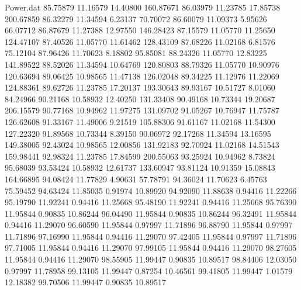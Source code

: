 \begin{filecontents}{Power.dat}
  85.75879   11.16579   14.40800  160.87671
  86.03979   11.23785   17.85738  200.67859
  86.32279   11.34594    6.23137   70.70072
  86.60079   11.09373    5.95626   66.07712
  86.87679   11.27388   12.97550  146.28423
  87.15579   11.05770   11.25650  124.47107
  87.40526   11.05770   11.61462  128.43109
  87.68226   11.02168    6.81576   75.12104
  87.96426   11.70623    8.18802   95.85081
  88.24326   11.05770   12.83225  141.89522
  88.52026   11.34594   10.64769  120.80803
  88.79326   11.05770   10.90976  120.63694
  89.06425   10.98565   11.47138  126.02048
  89.34225   11.12976   11.22069  124.88361
  89.62726   11.23785   17.20137  193.30643
  89.93167   10.51727    8.01060   84.24966
  90.21168   10.58932   12.40250  131.33408
  90.49168   10.73344   19.20687  206.15579
  90.77168   10.94962   11.97275  131.09702
  91.05267   10.76947   11.75787  126.62608
  91.33167   11.49006    9.21519  105.88306
  91.61167   11.02168   11.54300  127.22320
  91.89568   10.73344    8.39150   90.06972
  92.17268   11.34594   13.16595  149.38005
  92.43024   10.98565   12.00856  131.92183
  92.70924   11.02168   14.51543  159.98441
  92.98324   11.23785   17.84599  200.55063
  93.25924   10.94962    8.73824   95.68039
  93.53424   10.58932   12.61737  133.60947
  93.81124   10.91359   15.08843  164.66895
  94.08424   11.77829    4.90631   57.78791
  94.36024   11.70623    6.45763   75.59452
  94.63424   11.85035    0.91974   10.89920
  94.92090   11.88638    0.94416   11.22266
  95.19790   11.92241    0.94416   11.25668
  95.48190   11.92241    0.94416   11.25668
  95.76390   11.95844    0.90835   10.86244
  96.04490   11.95844    0.90835   10.86244
  96.32491   11.95844    0.94416   11.29070
  96.60590   11.95844    0.97997   11.71896
  96.88790   11.95844    0.97997   11.71896
  97.16990   11.95844    0.94416   11.29070
  97.42405   11.95844    0.97997   11.71896
  97.71005   11.95844    0.94416   11.29070
  97.99105   11.95844    0.94416   11.29070
  98.27605   11.95844    0.94416   11.29070
  98.55905   11.99447    0.90835   10.89517
  98.84406   12.03050    0.97997   11.78958
  99.13105   11.99447    0.87254   10.46561
  99.41805   11.99447    1.01579   12.18382
  99.70506   11.99447    0.90835   10.89517
\end{filecontents}
